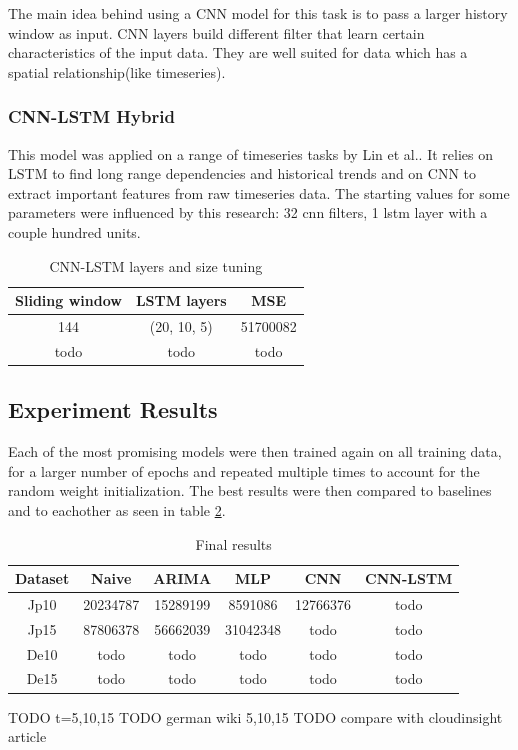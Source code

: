 \documentclass[12pt]{article}
\begin{document}
  The main idea behind using a CNN model for this task is to pass a larger history window as input. 
  CNN layers build different filter that learn certain characteristics of the input data. They are well 
  suited for data which has a spatial relationship(like timeseries)\cite{cnn}.

  \subsubsection{CNN-LSTM Hybrid}
  This model was applied on a range of timeseries tasks by Lin et al.\cite{cnn_lstm}.
  It relies on LSTM to find long range dependencies and historical trends and on CNN 
  to extract important features from raw timeseries data. The starting values for 
  some parameters were influenced by this research: 32 cnn filters, 1 lstm layer with 
  a couple hundred units.

  \begin{table}
    \begin{center}
      \caption{CNN-LSTM layers and size tuning}
      \label{tab:layers_cnn_lstm}
      \begin{tabular}{c|c|c}
        \textbf{Sliding window} & \textbf{LSTM layers} & \textbf{MSE}\\
        \hline
        144 & (20, 10, 5) & 51700082\\
        todo & todo & todo\\
      \end{tabular}
    \end{center}
  \end{table}


  \subsection{Experiment Results}

  Each of the most promising models were then trained again on all training data,
  for a larger number of epochs and repeated multiple times to account for the 
  random weight initialization. The best results were then compared to baselines
  and to eachother as seen in table \ref{tab:final_eval}.

  \begin{table}[h]
    \begin{center}
      \caption{Final results}
      \label{tab:final_eval}
      \begin{tabular}{c|c|c|c|c|c}
        \textbf{Dataset} & \textbf{Naive} & \textbf{ARIMA} & \textbf{MLP} & \textbf{CNN} & \textbf{CNN-LSTM} \\
        \hline
        Jp10 & 20234787 & 15289199 & 8591086 & 12766376 & todo \\
        Jp15 & 87806378 & 56662039 & 31042348 & todo & todo \\
        De10 & todo & todo & todo & todo & todo \\
        De15 & todo & todo & todo & todo & todo \\
      \end{tabular}
    \end{center}
  \end{table}

  TODO t=5,10,15
  TODO german wiki 5,10,15
  TODO compare with cloudinsight article

  \newpage
  {}
  
\end{document}
